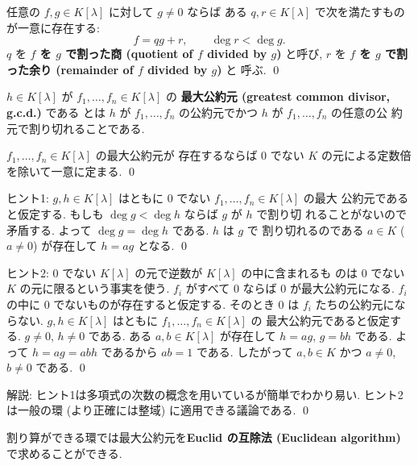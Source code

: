 \documentclass[12pt,twoside]{jarticle}
\begin{document}
\begin{question}
  任意の $f,g\in K[\lambda]$ に対して $g\ne 0$ ならば
  ある $q,r\in K[\lambda]$ で次を満たすものが一意に存在する:
  \begin{equation*}
    f = qg + r, \qquad \deg r < \deg g.
  \end{equation*}
  $q$ を {\bf $f$ を $g$ で割った商 (quotient of $f$ divided by $g$)} と呼び, 
  $r$ を {\bf $f$ を $g$ で割った余り (remainder of $f$ divided by $g$)} と
  呼ぶ.
  \qed
\end{question}


$h\in K[\lambda]$ が $f_1,\dots,f_n\in K[\lambda]$ の
{\bf 最大公約元 (greatest common divisor, g.c.d.)} である
とは $h$ が $f_1,\dots,f_n$ の公約元でかつ $h$ が $f_1,\dots,f_n$ の任意の公
約元で割り切れることである.

\begin{question}
  $f_1,\dots,f_n\in K[\lambda]$ の最大公約元が
  存在するならば $0$ でない $K$ の元による定数倍を除いて一意に定まる. 
  \qed
\end{question}

\noindent
ヒント1: 
$g,h\in K[\lambda]$ はともに $0$ でない $f_1,\dots,f_n\in K[\lambda]$ の最大
公約元であると仮定する. もしも $\deg g < \deg h$ ならば $g$ が $h$ で割り切
れることがないので矛盾する. よって $\deg g = \deg h$ である.  $h$ は $g$ で
割り切れるのである $a\in K$ ($a\ne 0$) が存在して $h=ag$ となる.
\qed

\medskip
\noindent
ヒント2: $0$ でない $K[\lambda]$ の元で逆数が $K[\lambda]$ の中に含まれるも
のは $0$ でない $K$ の元に限るという事実を使う.  
$f_i$ がすべて $0$ ならば $0$ が最大公約元になる.
$f_i$ の中に $0$ でないものが存在すると仮定する.
そのとき $0$ は $f_i$ たちの公約元にならない.
$g,h\in K[\lambda]$ はともに $f_1,\dots,f_n\in K[\lambda]$ の
最大公約元であると仮定する. $g\ne 0$, $h\ne 0$ である.
ある $a,b\in K[\lambda]$ が存在して $h=ag$, $g=bh$ である. 
よって $h=ag=abh$ であるから $ab=1$ である. 
したがって $a,b\in K$ かつ $a\ne 0$, $b\ne 0$ である.
\qed

\medskip
\noindent
解説: ヒント1は多項式の次数の概念を用いているが簡単でわかり易い.
ヒント2は一般の環 (より正確には整域) に適用できる議論である.
\qed


割り算ができる環では最大公約元を{\bf Euclid の互除法 (Euclidean algorithm)} 
で求めることができる.
\end{document}
